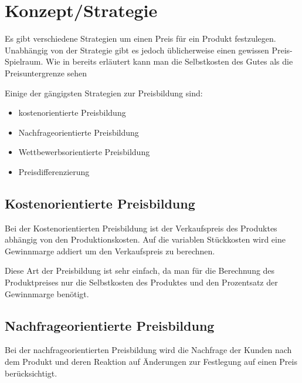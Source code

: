 

%
%

\chapter{Konzept/Strategie}

Es gibt verschiedene Strategien um einen Preis für ein Produkt festzulegen. Unabhängig von der Strategie gibt es jedoch üblicherweise einen gewissen Preis-Spielraum. Wie in  bereits erläutert kann man die Selbstkosten des Gutes als die Preisuntergrenze sehen

Einige der gängigsten Strategien zur Preisbildung sind:

\begin{itemize}
  \item kostenorientierte Preisbildung
  \item Nachfrageorientierte Preisbildung
  \item Wettbewerbsorientierte Preisbildung
  \item Preisdifferenzierung
\end{itemize}

\section{Kostenorientierte Preisbildung}

Bei der Kostenorientierten Preisbildung ist der Verkaufspreis des Produktes abhängig von den Produktionskosten. Auf die variablen Stückkosten wird eine Gewinnmarge addiert um den Verkaufspreis zu berechnen.

Diese Art der Preisbildung ist sehr einfach, da man für die Berechnung des Produktpreises nur die Selbstkosten des Produktes und den Prozentsatz der Gewinnmarge benötigt.

\section{Nachfrageorientierte Preisbildung}
Bei der nachfrageorientierten Preisbildung wird die Nachfrage der Kunden nach dem Produkt und deren Reaktion auf Änderungen zur Festlegung auf einen Preis berücksichtigt.

